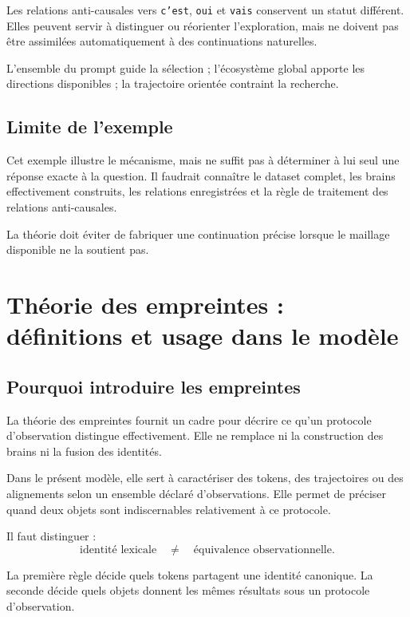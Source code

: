 \documentclass[11pt,a4paper]{report}
\theoremstyle{definition}
\theoremstyle{plain}
\theoremstyle{remark}
\begin{document}
Les relations anti-causales vers \texttt{c'est}, \texttt{oui}
et \texttt{vais} conservent un statut différent. Elles peuvent
servir à distinguer ou réorienter l'exploration, mais ne doivent
pas être assimilées automatiquement à des continuations naturelles.

L'ensemble du prompt guide la sélection ; l'écosystème global
apporte les directions disponibles ; la trajectoire orientée
contraint la recherche.

\section{Limite de l'exemple}

Cet exemple illustre le mécanisme, mais ne suffit pas à déterminer
à lui seul une réponse exacte à la question. Il faudrait connaître
le dataset complet, les brains effectivement construits, les
relations enregistrées et la règle de traitement des relations
anti-causales.

La théorie doit éviter de fabriquer une continuation précise
lorsque le maillage disponible ne la soutient pas.

\chapter{Théorie des empreintes : définitions et usage dans le modèle}

\section{Pourquoi introduire les empreintes}

La théorie des empreintes fournit un cadre pour décrire ce qu'un
protocole d'observation distingue effectivement. Elle ne remplace
ni la construction des brains ni la fusion des identités.

Dans le présent modèle, elle sert à caractériser des tokens,
des trajectoires ou des alignements selon un ensemble déclaré
d'observations. Elle permet de préciser quand deux objets sont
indiscernables relativement à ce protocole.

Il faut distinguer :
\[
\text{identité lexicale}
\quad\neq\quad
\text{équivalence observationnelle}.
\]

La première règle décide quels tokens partagent une identité
canonique. La seconde décide quels objets donnent les mêmes
résultats sous un protocole d'observation.
\end{document}
